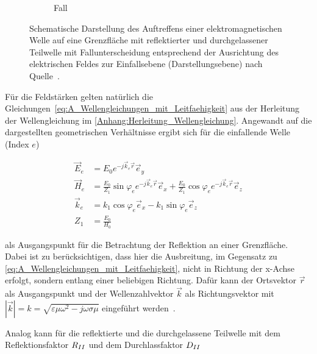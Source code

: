 \begin{figure}
\begin{subfigure}[c]{0.3\textwidth}
        \caption{Fall \label{subfig:2_Wellenreflektion_Fall2}}
    \end{subfigure}
    \caption[Schematische Darstellung des Auftreffens einer elektromagnetischen Welle auf eine Grenzfläche mit reflektierter und durchgelassener Teilwelle nach Quelle~\cite{EM_Schirmung}]{Schematische Darstellung des Auftreffens einer elektromagnetischen Welle auf eine Grenzfläche mit reflektierter und durchgelassener Teilwelle mit Fallunterscheidung entsprechend der Ausrichtung des elektrischen Feldes zur Einfallsebene (Darstellungsebene) nach Quelle~\cite{EM_Schirmung}.}
    \label{fig:2_Wellenreflektion}
\end{figure}

Für die Feldstärken gelten natürlich die Gleichungen~\eqref{eq:A_Wellengleichungen_mit_Leitfaehigkeit} aus der Herleitung der Wellengleichung im \Anhang \ref{Anhang:Herleitung_Wellengleichung}. Angewandt auf die dargestellten geometrischen Verhältnisse ergibt sich für die einfallende Welle (Index \glqq$e$\grqq)~\cite{EM_Schirmung}

\begin{align}
    \vec E_e &= E_0 e^{-j\vec k_e \vec r} \vec e_y \\
    \vec H_e &= \frac{E_0}{Z_1} \sin{\varphi_e} e^{-j \vec k_e \vec r} \vec e_x + \frac{E_0}{Z_1} \cos{\varphi_e} e^{-j \vec k_e \vec r} \vec e_z \\
    \vec k_e &= k_1 \cos{\varphi_e} \vec e_x - k_1 \sin{\varphi_e} \vec e_z \\
    Z_1 &= \frac{E_0}{H_0}
\end{align}

als Ausgangspunkt für die Betrachtung der Reflektion an einer Grenzfläche. Dabei ist zu berücksichtigen, dass hier die Ausbreitung, im Gegensatz zu \Gleichungen \eqref{eq:A_Wellengleichungen_mit_Leitfaehigkeit}, nicht in Richtung der x-Achse erfolgt, sondern entlang einer beliebigen Richtung. Dafür kann der Ortsvektor $\vec r$ als Ausgangspunkt und der Wellenzahlvektor $\vec k$ als Richtungsvektor mit
$|\vec k| = k = \sqrt{\varepsilon \mu \omega^2 - j \omega \sigma \mu} $ eingeführt werden~\cite{EM_Schirmung}. \par \vspace{\linespace} Analog kann für die reflektierte und die durchgelassene Teilwelle mit dem Reflektionsfaktor $R_{\uproman{2}}$ und dem Durchlassfaktor $D_{\uproman{2}}$

